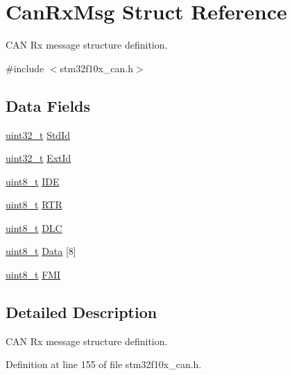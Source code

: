 \hypertarget{struct_can_rx_msg}{\section{Can\-Rx\-Msg Struct Reference}
\label{struct_can_rx_msg}
}


C\-A\-N Rx message structure definition.  




{\ttfamily \#include $<$stm32f10x\-\_\-can.\-h$>$}

\subsection*{Data Fields}
\begin{DoxyCompactItemize}
\item 
\hyperlink{stdint_8h_a435d1572bf3f880d55459d9805097f62}{uint32\-\_\-t} \hyperlink{struct_can_rx_msg_a62769e18836146f71238bee6b43b531e}{Std\-Id}
\item 
\hyperlink{stdint_8h_a435d1572bf3f880d55459d9805097f62}{uint32\-\_\-t} \hyperlink{struct_can_rx_msg_a1fdca10d31c81eea2ccef41d2aced562}{Ext\-Id}
\item 
\hyperlink{stdint_8h_aba7bc1797add20fe3efdf37ced1182c5}{uint8\-\_\-t} \hyperlink{struct_can_rx_msg_a83a67d1a709cc01570ce956e5adc811f}{I\-D\-E}
\item 
\hyperlink{stdint_8h_aba7bc1797add20fe3efdf37ced1182c5}{uint8\-\_\-t} \hyperlink{struct_can_rx_msg_a9a183149a391a24f86da2ce895f0f1c9}{R\-T\-R}
\item 
\hyperlink{stdint_8h_aba7bc1797add20fe3efdf37ced1182c5}{uint8\-\_\-t} \hyperlink{struct_can_rx_msg_abf77d3abf9ad290c08cdfd5d99ebc745}{D\-L\-C}
\item 
\hyperlink{stdint_8h_aba7bc1797add20fe3efdf37ced1182c5}{uint8\-\_\-t} \hyperlink{struct_can_rx_msg_a5c2e882cc599421bc40cac1618ddfe07}{Data} \mbox{[}8\mbox{]}
\item 
\hyperlink{stdint_8h_aba7bc1797add20fe3efdf37ced1182c5}{uint8\-\_\-t} \hyperlink{struct_can_rx_msg_a5afe39d8e295659eeb3030593828b96a}{F\-M\-I}
\end{DoxyCompactItemize}


\subsection{Detailed Description}
C\-A\-N Rx message structure definition. 

Definition at line 155 of file stm32f10x\-\_\-can.\-h.



